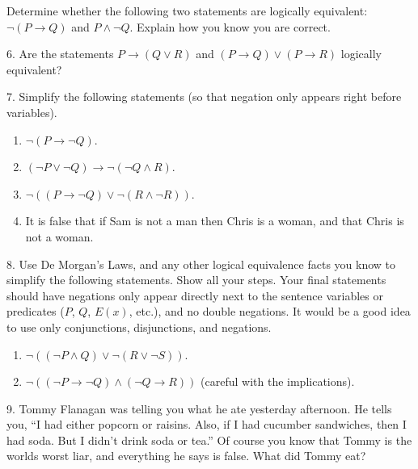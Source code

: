 \documentclass[10pt,]{book}
\theoremstyle{plain}
\theoremstyle{definition}
\theoremstyle{definition}
\theoremstyle{definition}
\theoremstyle{definition}
\numberwithin{equation}{chapter}
\newcommand{\imp}{\rightarrow}
\begin{document}
\begin{exerciselist}
Determine whether the following two statements are logically equivalent:  \(\neg(P \imp Q)\) and \(P \wedge \neg Q\). Explain how you know you are correct.%
\par\smallskip
\item[6.]\hypertarget{exercise-140}{}\hypertarget{p-1246}{}%
Are the statements \(P \imp (Q\vee R)\) and \((P \imp Q) \vee (P \imp R)\) logically equivalent?%
\par\smallskip
\item[7.]\hypertarget{exercise-141}{}\hypertarget{p-1247}{}%
Simplify the following statements (so that negation only appears right before variables).%
\par
\hypertarget{p-1248}{}%
\leavevmode%
\begin{enumerate}[label=(\alph*)]
\item\hypertarget{li-611}{}\(\neg(P \imp \neg Q)\).%
\item\hypertarget{li-612}{}\((\neg P \vee \neg Q) \imp \neg (\neg Q \wedge R)\).%
\item\hypertarget{li-613}{}\(\neg((P \imp \neg Q) \vee \neg (R \wedge \neg R))\).%
\item\hypertarget{li-614}{}\hypertarget{p-1249}{}%
It is false that if Sam is not a man then Chris is a woman, and that Chris is not a woman.%
\end{enumerate}
%
\par\smallskip
\item[8.]\hypertarget{exercise-142}{}\hypertarget{p-1253}{}%
Use De Morgan's Laws, and any other logical equivalence facts you know to simplify the following statements. Show all your steps. Your final statements should have negations only appear directly next to the sentence variables or predicates (\(P\), \(Q\), \(E(x)\), etc.), and no double negations. It would be a good idea to use only conjunctions, disjunctions, and negations.%
\par
\hypertarget{p-1254}{}%
\leavevmode%
\begin{enumerate}[label=(\alph*)]
\item\hypertarget{li-619}{}\(\neg((\neg P \wedge Q) \vee \neg(R \vee \neg S))\). %
\item\hypertarget{li-620}{}\(\neg((\neg P \imp \neg Q) \wedge (\neg Q \imp R))\) (careful with the implications). %
\end{enumerate}
%
\par\smallskip
\item[9.]\hypertarget{exercise-143}{}\hypertarget{p-1255}{}%
Tommy Flanagan was telling you what he ate yesterday afternoon. He tells you, ``I had either popcorn or raisins. Also, if I had cucumber sandwiches, then I had soda. But I didn't drink soda or tea.'' Of course you know that Tommy is the worlds worst liar, and everything he says is false. What did Tommy eat?%

\end{exerciselist}
\end{document}
